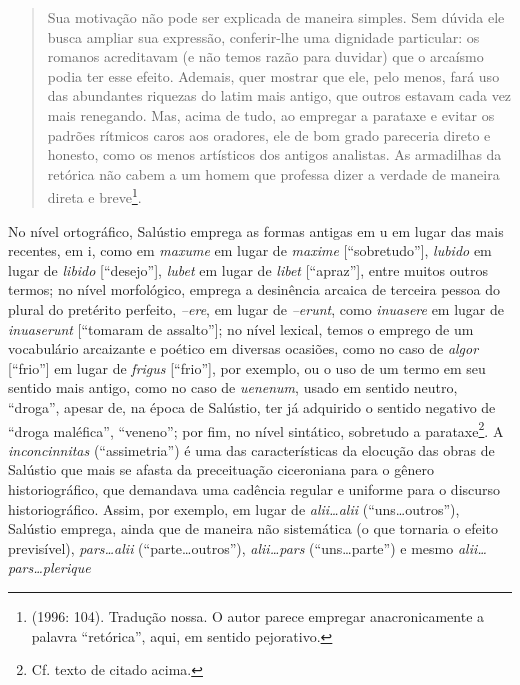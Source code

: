 \begin{quote} Sua motivação não pode ser explicada de maneira simples. Sem
  dúvida ele busca ampliar sua expressão, conferir-lhe uma dignidade
  particular: os romanos acreditavam (e não temos razão para duvidar) que o
  arcaísmo podia ter esse efeito. Ademais, quer mostrar que ele, pelo menos,
  fará uso das abundantes riquezas do latim mais antigo, que outros estavam
  cada vez mais renegando. Mas, acima de tudo, ao empregar a parataxe e evitar
  os padrões rítmicos caros aos oradores, ele de bom grado pareceria direto e
  honesto, como os menos artísticos dos antigos analistas. As armadilhas da
  retórica não cabem a um homem que professa dizer a verdade de maneira direta
  e breve\footnote{ (1996: 104). Tradução nossa. O autor parece empregar
    anacronicamente a palavra “retórica”, aqui, em sentido pejorativo.}.
 
\end{quote} No nível ortográfico, Salústio emprega as formas antigas em u em
lugar das mais recentes, em i, como em \emph{maxume} em lugar de \emph{maxime}
[“sobretudo”], \emph{lubido} em lugar de \emph{libido} [“desejo”], \emph{lubet}
em lugar de \emph{libet} [“apraz”], entre muitos outros termos; no nível
morfológico, emprega a desinência arcaica de terceira pessoa do plural do
pretérito perfeito, \emph{–ere}, em lugar de \emph{–erunt}, como
\emph{inuasere} em lugar de \emph{inuaserunt} [“tomaram de assalto”]; no nível lexical, temos o
emprego de um vocabulário arcaizante e poético em diversas ocasiões, como no
caso de \emph{algor} [“frio”] em lugar de \emph{frigus} [“frio”], por exemplo,
ou o uso de um termo em seu sentido mais antigo, como no caso de
\emph{uenenum}, usado em sentido neutro, “droga”, apesar de, na época de
Salústio, ter já adquirido o sentido negativo de “droga maléfica”, “veneno”;
por fim, no nível sintático, sobretudo a parataxe\footnote{Cf. texto de
 citado acima.}.  A \emph{inconcinnitas} (“assimetria”) é uma das
características da elocução das obras de Salústio que mais se afasta da
preceituação ciceroniana para o gênero historiográfico, que demandava uma
cadência regular e uniforme para o discurso historiográfico.  Assim, por
exemplo, em lugar de \emph{alii\dots alii} (“uns\ldots outros”), Salústio
emprega, ainda que de maneira não sistemática (o que tornaria o efeito
previsível), \emph{pars\dots alii} (“parte\dots outros”), \emph{alii\ldots{}pars}
(“uns\ldots parte”) e mesmo \emph{alii\dots pars\dots plerique}
